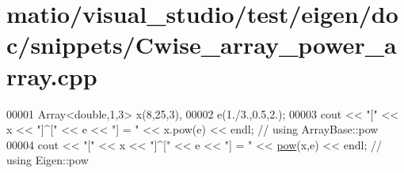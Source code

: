 \hypertarget{matio_2visual__studio_2test_2eigen_2doc_2snippets_2_cwise__array__power__array_8cpp_source}{}\section{matio/visual\+\_\+studio/test/eigen/doc/snippets/\+Cwise\+\_\+array\+\_\+power\+\_\+array.cpp}
\label{matio_2visual__studio_2test_2eigen_2doc_2snippets_2_cwise__array__power__array_8cpp_source}

\begin{DoxyCode}
00001 Array<double,1,3> x(8,25,3),
00002                   e(1./3.,0.5,2.);
00003 cout << \textcolor{stringliteral}{"["} << x << \textcolor{stringliteral}{"]^["} << e << \textcolor{stringliteral}{"] = "} << x.pow(e) << endl; \textcolor{comment}{// using ArrayBase::pow}
00004 cout << \textcolor{stringliteral}{"["} << x << \textcolor{stringliteral}{"]^["} << e << \textcolor{stringliteral}{"] = "} << \hyperlink{group___core___module_ab6dc101d82e8228a19a8840e3a29c1c9}{pow}(x,e) << endl; \textcolor{comment}{// using Eigen::pow}
\end{DoxyCode}
